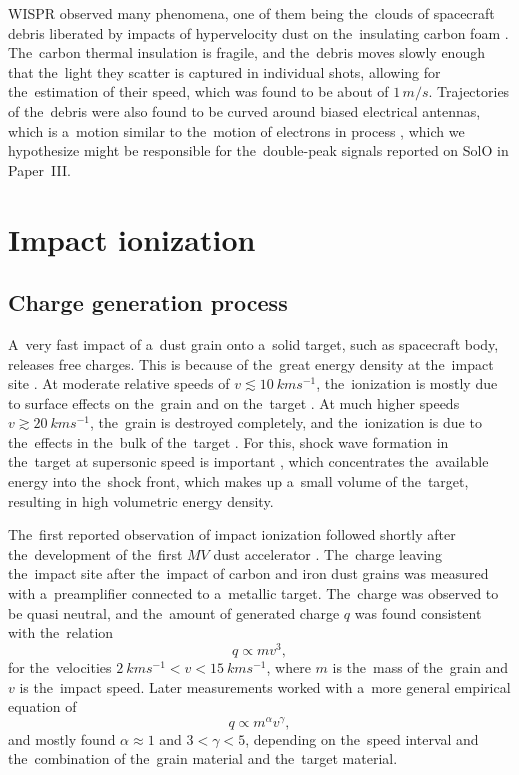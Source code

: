 WISPR observed many phenomena, one of them being the~clouds of spacecraft debris liberated by impacts of hypervelocity dust on the~insulating carbon foam \citep{malaspina2022clouds}. The~carbon thermal insulation is fragile, and the~debris moves slowly enough that the~light they scatter is captured in individual shots, allowing for the~estimation of their speed, which was found to be about of $1 \, \si{m/s}$. Trajectories of the~debris were also found to be curved around biased electrical antennas, which is a~motion similar to the~motion of electrons in \citeauthor{pantellini2012nano} process \citep{pantellini2012nano}, which we hypothesize might be responsible for the~double-peak signals reported on SolO in Paper~III. 


\section{Impact ionization}

\subsection{Charge generation process}

A~very fast impact of a~dust grain onto a~solid target, such as spacecraft body, releases free charges. This is because of the~great energy density at the~impact site \citep{shen2021cosmic}. At moderate relative speeds of $v \lesssim \SI{10}{kms^{-1}}$, the~ionization is mostly due to surface effects on the~grain and on the~target \citep{kissel1987ion}. At much higher speeds $v \gtrsim \SI{20}{kms^{-1}}$, the~grain is destroyed completely, and the~ionization is due to the~effects in the~bulk of the~target \citep{hornung1994shock}. For this, shock wave formation in the~target at supersonic speed is important \citep{drapatz1974theory}, which concentrates the~available energy into the~shock front, which makes up a~small volume of the~target, resulting in high volumetric energy density. 

The~first reported observation \citep{friichtenicht1964} of impact ionization followed shortly after the~development of the~first $\si{MV}$ dust accelerator \citep{friichtenicht1962}. The~charge leaving the~impact site after the~impact of carbon and iron dust grains was measured with a~preamplifier connected to a~metallic target. The~charge was observed to be quasi neutral, and the~amount of generated charge $q$ was found consistent with the~relation
\begin{equation}
    q \propto m v^3,
\end{equation}
for the~velocities  $\SI{2}{kms^{-1}} < v < \SI{15}{kms^{-1}}$, where $m$ is the~mass of the~grain and $v$ is the~impact speed. Later measurements \citep{auer1968,mcbride1999meteoroid,grun1984impact,collette2014micrometeoroid,shen2021cosmic} worked with a~more general empirical equation of 
\begin{equation}
    q \propto m^\alpha v^\gamma, \label{eq:charge_generation}
\end{equation}
and mostly found $\alpha \approx 1$ and $3 < \gamma < 5$, depending on the~speed interval and the~combination of the~grain material and the~target material. 

